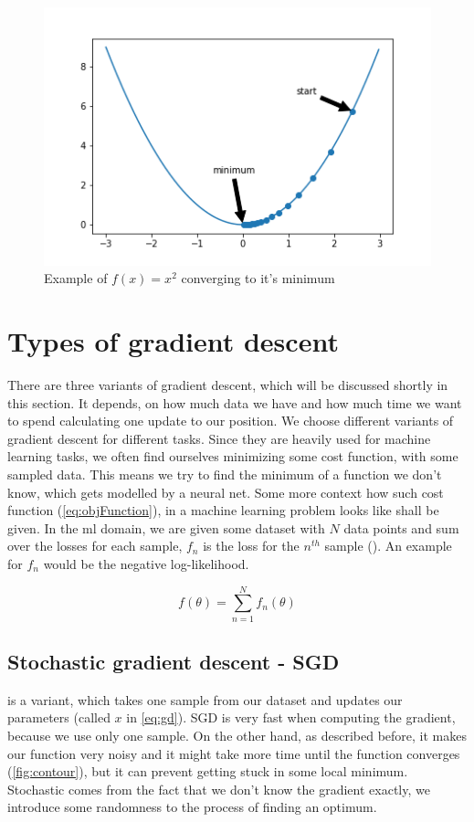 \documentclass[aodsor,preprint]{imsart}
\numberwithin{equation}{section}
\theoremstyle{plain}
\begin{document}
\begin{figure}[htb]
\centering
\includegraphics[width=\textwidth]{images/gd_ex1.png}
\caption{Example of $f(x) = x^2$ converging to it's minimum}
\label{fig:gdex1}
\end{figure}


\section{Types of gradient descent}
There are three variants of gradient descent, which will be discussed shortly in this section. It depends, on how much data we have and how much time we want to spend calculating one update to our position. We choose different variants of gradient descent for different tasks. Since they are heavily used for machine learning tasks, we often find ourselves minimizing some cost function, with some sampled data. This means we try to find the minimum of a function we don't know, which gets modelled by a neural net. Some more context how such cost function (\ref{eq:objFunction}), in a machine learning problem looks like shall be given. In the ml domain, we are given some dataset with $N$ data points and sum over the losses for each sample, $f_{n}$ is the loss for the $n^{th}$ sample (\cite{Deisenroth2020}). An example for $f_{n}$ would be the negative log-likelihood.

\begin{equation} \label{eq:objFunction2}
f(\theta) = \sum_{n=1}^{N} f_{n}(\theta)
\end{equation}


\subsection{Stochastic gradient descent - SGD}
is a variant, which takes one sample from our dataset and updates our parameters (called $x$ in \ref{eq:gd}). SGD is very fast when computing the gradient, because we use only one sample. On the other hand, as described before, it makes our function very noisy and it might take more time until the function converges (\ref{fig:contour}), but it can prevent getting stuck in some local minimum. Stochastic comes from the fact that we don't know the gradient exactly, we introduce some randomness to the process of finding an optimum. 
\end{document}
